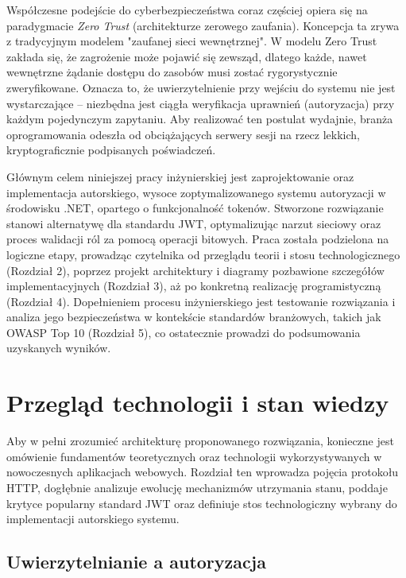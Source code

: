 \documentclass{SGGW-thesis}
\begin{document}
Współczesne podejście do cyberbezpieczeństwa coraz częściej opiera się na paradygmacie \textit{Zero Trust} (architekturze zerowego zaufania). Koncepcja ta zrywa z tradycyjnym modelem "zaufanej sieci wewnętrznej". W modelu Zero Trust zakłada się, że zagrożenie może pojawić się zewsząd, dlatego każde, nawet wewnętrzne żądanie dostępu do zasobów musi zostać rygorystycznie zweryfikowane. Oznacza to, że uwierzytelnienie przy wejściu do systemu nie jest wystarczające – niezbędna jest ciągła weryfikacja uprawnień (autoryzacja) przy każdym pojedynczym zapytaniu. Aby realizować ten postulat wydajnie, branża oprogramowania odeszła od obciążających serwery sesji na rzecz lekkich, kryptograficznie podpisanych poświadczeń.

Głównym celem niniejszej pracy inżynierskiej jest zaprojektowanie oraz implementacja autorskiego, wysoce zoptymalizowanego systemu autoryzacji w środowisku .NET, opartego o funkcjonalność tokenów. Stworzone rozwiązanie stanowi alternatywę dla standardu JWT, optymalizując narzut sieciowy oraz proces walidacji ról za pomocą operacji bitowych. Praca została podzielona na logiczne etapy, prowadząc czytelnika od przeglądu teorii i stosu technologicznego (Rozdział 2), poprzez projekt architektury i diagramy pozbawione szczegółów implementacyjnych (Rozdział 3), aż po konkretną realizację programistyczną (Rozdział 4). Dopełnieniem procesu inżynierskiego jest testowanie rozwiązania i analiza jego bezpieczeństwa w kontekście standardów branżowych, takich jak OWASP Top 10 (Rozdział 5), co ostatecznie prowadzi do podsumowania uzyskanych wyników.

\clearpage

\startchapterfromoddpage
\chapter{Przegląd technologii i stan wiedzy}

Aby w pełni zrozumieć architekturę proponowanego rozwiązania, konieczne jest omówienie fundamentów teoretycznych oraz technologii wykorzystywanych w nowoczesnych aplikacjach webowych. Rozdział ten wprowadza pojęcia protokołu HTTP, dogłębnie analizuje ewolucję mechanizmów utrzymania stanu, poddaje krytyce popularny standard JWT oraz definiuje stos technologiczny wybrany do implementacji autorskiego systemu.

\section{Uwierzytelnianie a autoryzacja}
\end{document}
